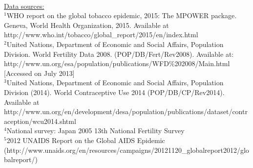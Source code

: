 { \\ \underline{Data sources:} \\ 
$^{1}$WHO report on the global tobacco epidemic, 2015: The MPOWER package. Geneva, World Health Organization, 2015. Available at http://www.who.int/tobacco/global\_report/2015/en/index.html \\
$^{2}$United Nations, Department of Economic and Social Affairs, Population Division. World Fertility Data 2008. (POP/DB/Fert/Rev2008). Available at: http://www.un.org/esa/population/publications/WFD\%202008/Main.html [Accessed on July 2013] \\
$^{3}$United Nations, Department of Economic and Social Affairs, Population Division (2014). World Contraceptive Use 2014 (POP/DB/CP/Rev2014). Available at http://www.un.org/en/development/desa/population/publications/dataset/contraception/wcu2014.shtml \\
$^{4}$National survey: Japan 2005 13th National Fertility Survey \\
$^{5}$2012 UNAIDS Report on the Global AIDS Epidemic  (http://www.unaids.org/en/resources/campaigns/20121120\_globalreport2012/globalreport/) \\
}
\clearpage
